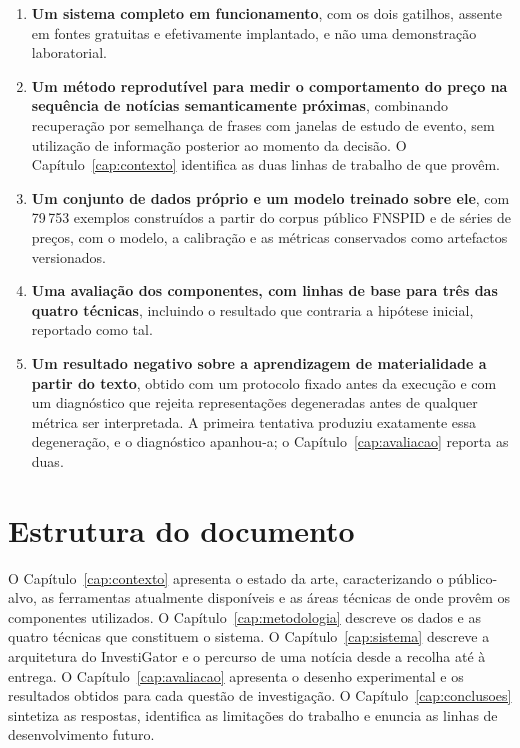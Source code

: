 \begin{enumerate}
  \item \textbf{Um sistema completo em funcionamento}, com os dois gatilhos, assente em fontes
        gratuitas e efetivamente implantado, e não uma demonstração laboratorial.
  \item \textbf{Um método reprodutível para medir o comportamento do preço na sequência de
        notícias semanticamente próximas}, combinando recuperação por semelhança de frases com
        janelas de estudo de evento, sem utilização de informação posterior ao momento da decisão.
        O Capítulo~\ref{cap:contexto} identifica as duas linhas de trabalho de que provêm.
  \item \textbf{Um conjunto de dados próprio e um modelo treinado sobre ele}, com 79\,753 exemplos
        construídos a partir do corpus público \gls{FNSPID} \autocite{dong2024fnspid} e de séries
        de preços, com o modelo, a calibração e as métricas conservados como artefactos
        versionados.
  \item \textbf{Uma avaliação dos componentes, com linhas de base para três das quatro técnicas}, incluindo o
        resultado que contraria a hipótese inicial, reportado como tal.
  \item \textbf{Um resultado negativo sobre a aprendizagem de materialidade a partir do texto},
        obtido com um protocolo fixado antes da execução e com um diagnóstico que rejeita
        representações degeneradas antes de qualquer métrica ser interpretada. A primeira
        tentativa produziu exatamente essa degeneração, e o diagnóstico apanhou-a; o
        Capítulo~\ref{cap:avaliacao} reporta as duas.
\end{enumerate}

\section{Estrutura do documento}
\label{sec:intro_estrutura}

O Capítulo~\ref{cap:contexto} apresenta o estado da arte, caracterizando o público-alvo, as
ferramentas atualmente disponíveis e as áreas técnicas de onde provêm os componentes utilizados.
O Capítulo~\ref{cap:metodologia} descreve os dados e as quatro técnicas que constituem o sistema.
O Capítulo~\ref{cap:sistema} descreve a arquitetura do InvestiGator e o percurso de uma notícia
desde a recolha até à entrega. O Capítulo~\ref{cap:avaliacao} apresenta o desenho experimental e
os resultados obtidos para cada questão de investigação. O Capítulo~\ref{cap:conclusoes} sintetiza
as respostas, identifica as limitações do trabalho e enuncia as linhas de desenvolvimento futuro.

